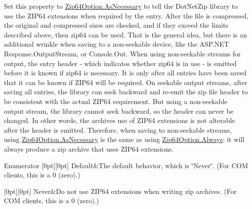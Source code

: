 Set this property to \mbox{\hyperlink{namespace_super_tiled2_unity_1_1_ionic_1_1_zip_a0c873ba2a5b73de966e876643830dc69a7bfa2d7f3d5b79692fe22a06113406c8}{Zip64\+Option.\+As\+Necessary}} to tell the Dot\+Net\+Zip library to use the Z\+I\+P64 extensions when required by the entry. After the file is compressed, the original and compressed sizes are checked, and if they exceed the limits described above, then zip64 can be used. That is the general idea, but there is an additional wrinkle when saving to a non-\/seekable device, like the A\+S\+P.\+N\+ET {\ttfamily Response.\+Output\+Stream}, or {\ttfamily Console.\+Out}. When using non-\/seekable streams for output, the entry header -\/ which indicates whether zip64 is in use -\/ is emitted before it is known if zip64 is necessary. It is only after all entries have been saved that it can be known if Z\+I\+P64 will be required. On seekable output streams, after saving all entries, the library can seek backward and re-\/emit the zip file header to be consistent with the actual Z\+I\+P64 requirement. But using a non-\/seekable output stream, the library cannot seek backward, so the header can never be changed. In other words, the archive\textquotesingle{}s use of Z\+I\+P64 extensions is not alterable after the header is emitted. Therefore, when saving to non-\/seekable streams, using \mbox{\hyperlink{namespace_super_tiled2_unity_1_1_ionic_1_1_zip_a0c873ba2a5b73de966e876643830dc69a7bfa2d7f3d5b79692fe22a06113406c8}{Zip64\+Option.\+As\+Necessary}} is the same as using \mbox{\hyperlink{namespace_super_tiled2_unity_1_1_ionic_1_1_zip_a0c873ba2a5b73de966e876643830dc69a68eec46437c384d8dad18d5464ebc35c}{Zip64\+Option.\+Always}}\+: it will always produce a zip archive that uses Z\+I\+P64 extensions. \begin{DoxyEnumFields}{Enumerator}
[0pt][0pt]{}\mbox{\label{namespace_super_tiled2_unity_1_1_ionic_1_1_zip_a0c873ba2a5b73de966e876643830dc69a7a1920d61156abc05a60135aefe8bc67}} 
Default&The default behavior, which is \char`\"{}\+Never\char`\"{}. (For C\+OM clients, this is a 0 (zero).) \\
\hline

[0pt][0pt]{}\mbox{\label{namespace_super_tiled2_unity_1_1_ionic_1_1_zip_a0c873ba2a5b73de966e876643830dc69a6e7b34fa59e1bd229b207892956dc41c}} 
Never&Do not use Z\+I\+P64 extensions when writing zip archives. (For C\+OM clients, this is a 0 (zero).) \\
\hline


\end{DoxyEnumFields}

